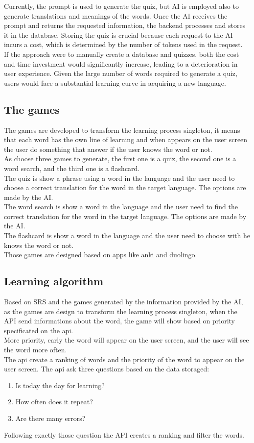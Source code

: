 \documentclass[12pt]{article}
\begin{document}
  Currently, the prompt is used to generate the quiz, but AI is employed also to generate translations and meanings of the words. Once the AI receives the prompt and returns the requested information, the backend processes and stores it in the database. Storing the quiz is crucial because each request to the AI incurs a cost, which is determined by the number of tokens used in the request. \\
  If the approach were to manually create a database and quizzes, both the cost and time investment would significantly increase, leading to a deterioration in user experience. Given the large number of words required to generate a quiz, users would face a substantial learning curve in acquiring a new language.

\subsection{The games}
  The games are developed to transform the learning process singleton, it means that each word has the own line of learning and when appears on the user screen the user do something that answer if the user knows the word or not. \\
  As choose three games to generate, the first one is a quiz, the second one is a word search, and the third one is a flashcard. \\
  The quiz is show a phrase using a word in the language and the user need to choose a correct translation for the word in the target language. The options are made by the AI. \\
  The word search is show a word in the language and the user need to find the correct translation for the word in the target language. The options are made by the AI. \\
  The flashcard is show a word in the language and the user need to choose with he knows the word or not. \\
  Those games are designed based on apps like anki and duolingo.
\subsection{Learning algorithm}
Based on SRS and the games generated by the information provided by the AI, as the games are design to transform the learning process singleton, when the API send informations about the word, the game will show based on priority specificated on the api. \\
More priority, early the word will appear on the user screen, and the user will see the word more often. \\
The api create a ranking of words and the priority of the word to appear on the user screen. The api ask three questions based on the data storaged: 
\begin{enumerate}
  \item Is today the day for learning?
  \item How often does it repeat? 
  \item Are there many errors?
\end{enumerate}
Following exactly those question the API creates a ranking and filter the words. \\
\end{document}
